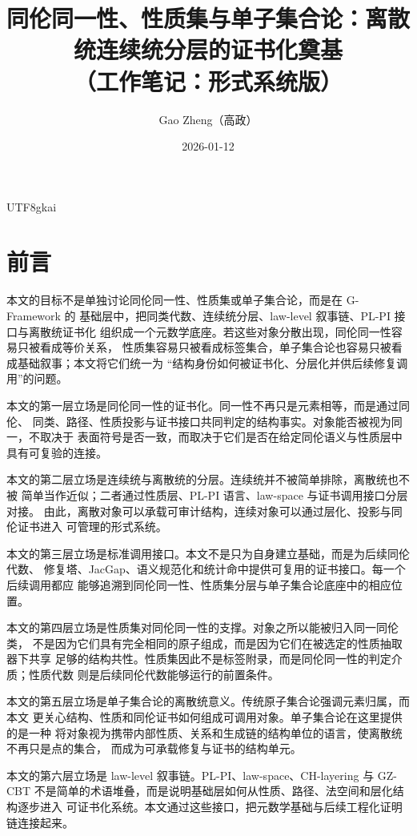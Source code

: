 \documentclass[12pt]{article}
\newcommand{\GFramework}{\textsf{G-Framework}}
\begin{document}
\begin{CJK*}{UTF8}{gkai}

\title{同伦同一性、性质集与单子集合论：离散统连续统分层的证书化奠基\\（工作笔记：形式系统版）}
\author{Gao Zheng（高政）}
\date{2026-01-12}
\maketitle

\section*{前言}

本文的目标不是单独讨论同伦同一性、性质集或单子集合论，而是在 \GFramework{} 的
基础层中，把同类代数、连续统分层、law-level 叙事链、PL-PI 接口与离散统证书化
组织成一个元数学底座。若这些对象分散出现，同伦同一性容易只被看成等价关系，
性质集容易只被看成标签集合，单子集合论也容易只被看成基础叙事；本文将它们统一为
“结构身份如何被证书化、分层化并供后续修复调用”的问题。

本文的第一层立场是同伦同一性的证书化。同一性不再只是元素相等，而是通过同伦、
同类、路径、性质投影与证书接口共同判定的结构事实。对象能否被视为同一，不取决于
表面符号是否一致，而取决于它们是否在给定同伦语义与性质层中具有可复验的连接。

本文的第二层立场是连续统与离散统的分层。连续统并不被简单排除，离散统也不被
简单当作近似；二者通过性质层、PL-PI 语言、law-space 与证书调用接口分层对接。
由此，离散对象可以承载可审计结构，连续对象可以通过层化、投影与同伦证书进入
可管理的形式系统。

本文的第三层立场是标准调用接口。本文不是只为自身建立基础，而是为后续同伦代数、
修复塔、JacGap、语义规范化和统计命中提供可复用的证书接口。每一个后续调用都应
能够追溯到同伦同一性、性质集分层与单子集合论底座中的相应位置。

本文的第四层立场是性质集对同伦同一性的支撑。对象之所以能被归入同一同伦类，
不是因为它们具有完全相同的原子组成，而是因为它们在被选定的性质抽取器下共享
足够的结构共性。性质集因此不是标签附录，而是同伦同一性的判定介质；性质代数
则是后续同伦代数能够运行的前置条件。

本文的第五层立场是单子集合论的离散统意义。传统原子集合论强调元素归属，而本文
更关心结构、性质和同伦证书如何组成可调用对象。单子集合论在这里提供的是一种
将对象视为携带内部性质、关系和生成链的结构单位的语言，使离散统不再只是点的集合，
而成为可承载修复与证书的结构单元。

本文的第六层立场是 law-level 叙事链。PL-PI、law-space、CH-layering 与 GZ-CBT
不是简单的术语堆叠，而是说明基础层如何从性质、路径、法空间和层化结构逐步进入
可证书化系统。本文通过这些接口，把元数学基础与后续工程化证明链连接起来。


\end{CJK*}
\end{document}
